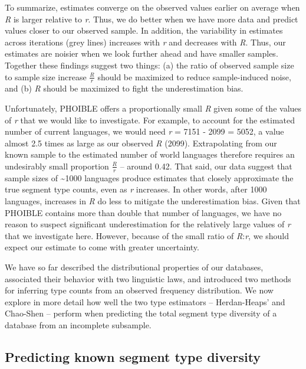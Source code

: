 \documentclass[
]{article}
\begin{document}
To summarize, estimates converge on the observed values earlier on
average when \emph{R} is larger relative to \emph{r}. Thus, we do better
when we have more data and predict values closer to our observed sample.
In addition, the variability in estimates across iterations (grey lines)
increases with \emph{r} and decreases with \emph{R}. Thus, our estimates
are noisier when we look further ahead and have smaller samples.
Together these findings suggest two things: (a) the ratio of observed
sample size to sample size increase \(\frac{R}{r}\) should be maximized
to reduce sample-induced noise, and (b) \emph{R} should be maximized to
fight the underestimation bias.

Unfortunately, PHOIBLE offers a proportionally small \emph{R} given some
of the values of \emph{r} that we would like to investigate. For
example, to account for the estimated number of current languages, we
would need \emph{r} = 7151 - 2099 = 5052, a value almost 2.5 times as
large as our observed \emph{R} (2099). Extrapolating from our known
sample to the estimated number of world languages therefore requires an
undesirably small proportion \(\frac{R}{r}\) -- around 0.42. That said,
our data suggest that sample sizes of \textasciitilde1000 languages
produce estimates that closely approximate the true segment type counts,
even as \emph{r} increases. In other words, after 1000 languages,
increases in \emph{R} do less to mitigate the underestimation bias.
Given that PHOIBLE contains more than double that number of languages,
we have no reason to suspect significant underestimation for the
relatively large values of \emph{r} that we investigate here. However,
because of the small ratio of \emph{R}:\emph{r}, we should expect our
estimate to come with greater uncertainty.

We have so far described the distributional properties of our databases,
associated their behavior with two linguistic laws, and introduced two
methods for inferring type counts from an observed frequency
distribution. We now explore in more detail how well the two type
estimators -- Herdan-Heaps' and Chao-Shen -- perform when predicting the
total segment type diversity of a database from an incomplete subsample.

\hypertarget{predicting-known-segment-type-diversity}{%
\subsection{Predicting known segment type
diversity}\label{predicting-known-segment-type-diversity}}
\end{document}
